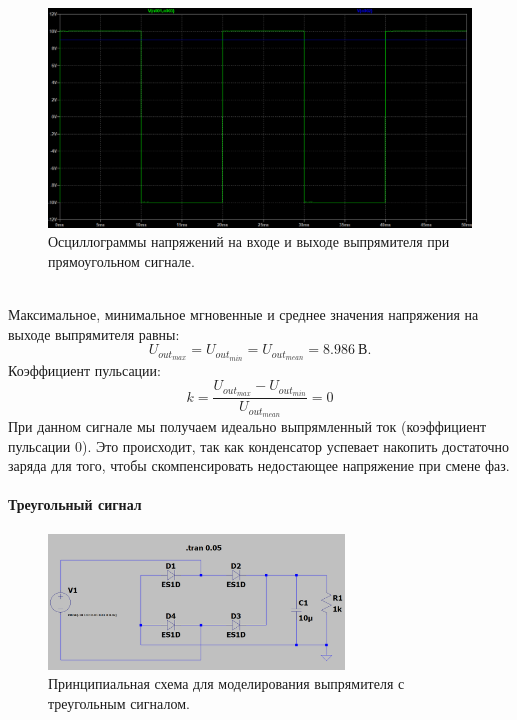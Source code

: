 \documentclass[12pt]{article}
\begin{document}
\begin{figure}[H]
    \centering
    \includegraphics[width=\textwidth]{4_rect_voltages.png}
    \caption{Осциллограммы напряжений на входе и выходе выпрямителя при прямоугольном сигнале.}
    \label{fig:4_rect_voltages.png}
\end{figure}\\

Максимальное, минимальное мгновенные и среднее значения напряжения на выходе выпрямителя равны:
\[
U_{out_{max}} = U_{out_{min}} = U_{{out}_{mean}} = 8.986 \ \text{В}.
\]
Коэффициент пульсации:
\[
k = \frac{U_{out_{max}} - U_{out_{min}}}{U_{{out}_{mean}}} = 0
\]
При данном сигнале мы получаем идеально выпрямленный ток (коэффициент пульсации $0$). Это происходит, так как конденсатор успевает накопить достаточно заряда для того, чтобы скомпенсировать недостающее напряжение при смене фаз.

\paragraph*{Треугольный сигнал}

\begin{figure}[H]
    \centering
    \includegraphics[width=0.7\textwidth]{4_triangular_signal.png}
    \caption{Принципиальная схема для моделирования выпрямителя с треугольным сигналом.}
    \label{fig:4_triangular_signal.png}
\end{figure}\\
\end{document}
